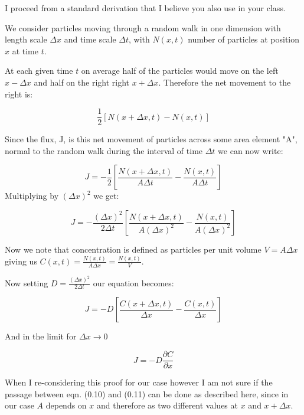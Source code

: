 \documentclass{amsart}
\theoremstyle{plain}
\numberwithin{equation}{section}
\begin{document}
I proceed from a standard derivation that I believe you also use in your class.

We consider particles moving through a random walk in one dimension with length scale $\Delta x$ and time scale $\Delta t$, with $N(x, t)$ number of particles at position $x$ at time $t$.

At each given time $t$ on average half of the particles would move on the left $x-\Delta x$ and half on the right right $x+\Delta x$. Therefore the net movement to the right is:

\begin{equation}
\frac{1}{2}\left[N(x + \Delta x, t) - N(x, t)\right]
\end{equation}

Since the flux, J, is this net movement of particles across some area element "A", normal to the random walk during the interval of time $\Delta t$ we can now write:

\begin{equation}
J = - \frac{1}{2} \left[\frac{ N(x + \Delta x, t)}{A \Delta t} - \frac{ N(x, t)}{A \Delta t}\right]
\end{equation} 
Multiplying  by $(\Delta x)^2$ we get:


\begin{equation}
 J = -\frac{\left(\Delta x\right)^2}{2 \Delta t}\left[\frac{N(x + \Delta x, t)}{A (\Delta x)^2} - \frac{N(x, t)}{A (\Delta x)^2}\right]
 \end{equation}

Now we note that concentration is defined as particles per unit volume $V=A\Delta x$ giving us $C (x, t) = \frac{N(x, t)}{A \Delta x}=\frac{N(x, t)}{V}$.

Now setting $D=\frac{\left(\Delta x\right)^2}{2 \Delta t}$ our equation becomes:

\begin{equation}
 J = -D \left[\frac{C (x + \Delta x, t)}{\Delta x} - \frac{C (x , t)}{\Delta x}\right]
 \end{equation}

And in the limit for $\Delta x\rightarrow 0$ 

\begin{equation}
 J = - D \frac{\partial C}{\partial x}  
 \end{equation}
 
 When I re-considering this proof for our case however I am not sure if the passage between eqn. (0.10) and (0.11) can be done as described here, since in our case $A$ depends on $x$ and therefore as two different values at $x$ and $x+\Delta x$. \\\\
 
\end{document}
